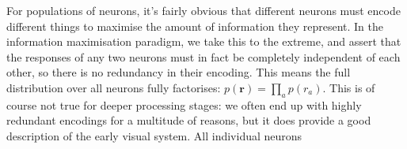 \documentclass{article}
\begin{document}
For populations of neurons, it's fairly obvious that different neurons must encode different things to maximise the amount of information they represent. In the information maximisation paradigm, we take this to the extreme, and assert that the responses of any two neurons must in fact be completely independent of each other, so there is no redundancy in their encoding. This means the full distribution over all neurons fully factorises: $p(\bm{r})=\prod_ap(r_a)$. This is of course not true for deeper processing stages: we often end up with highly redundant encodings for a multitude of reasons, but it does provide a good description of the early visual system. All individual neurons 
\end{document}
